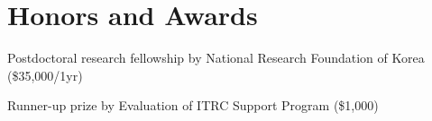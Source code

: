 \section*{Honors and Awards}
\begin{description}
\item Postdoctoral research fellowship by
  National Research Foundation of Korea (\$35,000/1yr) 

\item Runner-up prize by
  Evaluation of ITRC Support Program (\$1,000) 

\end{description}
